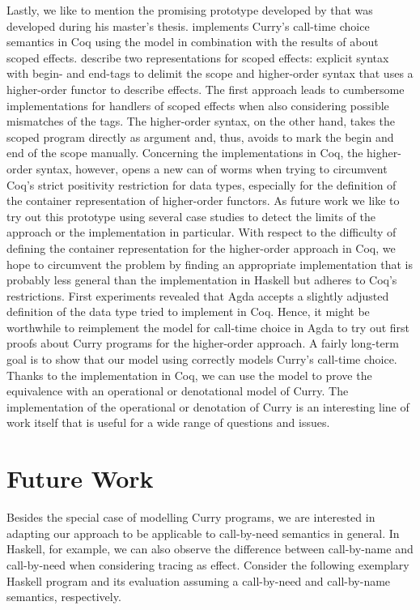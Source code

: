 Lastly, we like to mention the promising prototype developed by \citet{bunkenburg2019modeling} that was developed during his master's thesis.
\citeauthor{bunkenburg2019modeling} implements Curry's call\--time choice semantics in Coq using the  model in combination with the results of \citet{wu2014effect} about scoped effects.
\citeauthor{wu2014effect} describe two representations for scoped effects: explicit syntax with begin\-- and end\--tags to delimit the scope and higher\--order syntax that uses a higher\--order functor to describe effects.
The first approach leads to cumbersome implementations for handlers of scoped effects when also considering possible mismatches of the tags.
The higher\--order syntax, on the other hand, takes the scoped program directly as argument and, thus, avoids to mark the begin and end of the scope manually.
Concerning the implementations in Coq, the higher\--order syntax, however, opens a new can of worms when trying to circumvent Coq's strict positivity restriction for data types, especially for the definition of the container representation of higher\--order functors.
As future work we like to try out this prototype using several case studies to detect the limits of the approach or the implementation in particular.
With respect to the difficulty of defining the container representation for the higher\--order approach in Coq, we hope to circumvent the problem by finding an appropriate implementation that is probably less general than the implementation in Haskell but
adheres to Coq's restrictions.
First experiments revealed that Agda accepts a slightly adjusted definition of the data type \citeauthor{bunkenburg2019modeling} tried to implement in Coq.
Hence, it might be worthwhile to reimplement the model for call\--time choice in Agda to try out first proofs about Curry programs for the higher\--order approach.
A fairly long\--term goal is to show that our model using  correctly models Curry's call\--time choice.
Thanks to the implementation in Coq, we can use the model to prove the equivalence with an operational or denotational model of Curry.
The implementation of the operational or denotation of Curry is an interesting line of work itself that is useful for a wide range of questions and issues.

\section{Future Work}

Besides the special case of modelling Curry programs, we are interested in adapting our approach to be applicable to call\--by\--need semantics in general.
In Haskell, for example, we can also observe the difference between call\--by\--name and call\--by\--need when considering tracing as effect.
Consider the following exemplary Haskell program and its evaluation assuming a call\--by\--need and call\--by\--name semantics, respectively.

